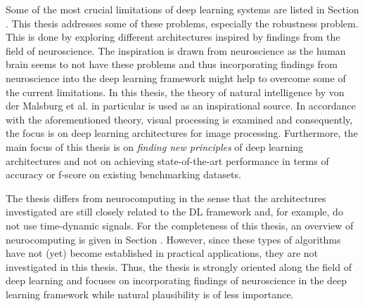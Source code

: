 Some of the most crucial limitations of deep learning systems are listed in Section .
This thesis addresses some of these problems, especially the robustness problem.
This is done by exploring different architectures inspired by findings from the field of neuroscience.
The inspiration is drawn from neuroscience as the human brain seems to not have these problems and thus incorporating findings from neuroscience into the deep learning framework might help to overcome some of the current limitations.
In this thesis, the theory of natural intelligence by von der Malsburg et al.  in particular is used as an inspirational source.
In accordance with the aforementioned theory, visual processing is examined and consequently, the focus is on deep learning architectures for image processing.
Furthermore, the main focus of this thesis is on \emph{finding new principles} of deep learning architectures and not on achieving state-of-the-art performance in terms of accuracy or f-score on existing benchmarking datasets.

The thesis differs from neurocomputing in the sense that the architectures investigated are still closely related to the DL framework and, for example, do not use time-dynamic signals. 
For the completeness of this thesis, an overview of neurocomputing is given in Section .
However, since these types of algorithms have not (yet) become established in practical applications, they are not investigated in this thesis.
Thus, the thesis is strongly oriented along the field of deep learning and focuses on incorporating findings of neuroscience in the deep learning framework while natural plausibility is of less importance.


